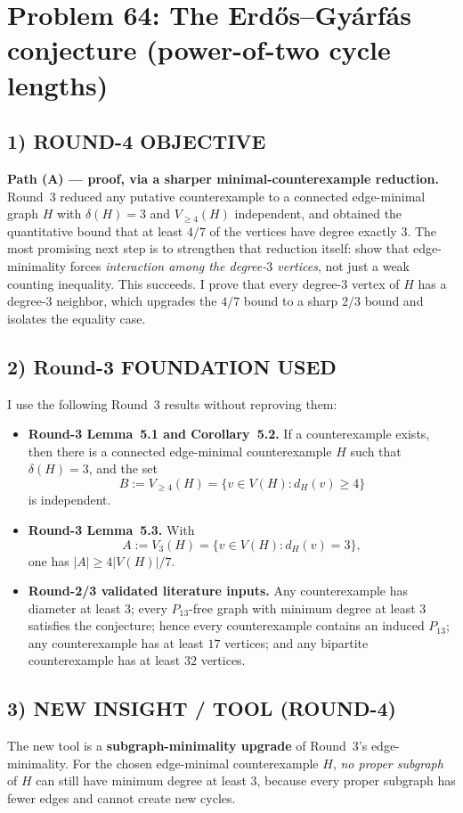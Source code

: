 
\section{Problem 64: The Erd\H{o}s--Gy\'arf\'as conjecture (power-of-two cycle lengths)}

\subsection*{1) ROUND-4 OBJECTIVE}
\textbf{Path (A) --- proof, via a sharper minimal-counterexample reduction.} Round~3 reduced any putative counterexample to a connected edge-minimal graph $H$ with $\delta(H)=3$ and $V_{\ge 4}(H)$ independent, and obtained the quantitative bound that at least $4/7$ of the vertices have degree exactly $3$. The most promising next step is to strengthen that reduction itself: show that edge-minimality forces \emph{interaction among the degree-$3$ vertices}, not just a weak counting inequality. This succeeds. I prove that every degree-$3$ vertex of $H$ has a degree-$3$ neighbor, which upgrades the $4/7$ bound to a sharp $2/3$ bound and isolates the equality case.

\subsection*{2) Round-3 FOUNDATION USED}
I use the following Round~3 results without reproving them:
\begin{itemize}
  \item \textbf{Round-3 Lemma~5.1 and Corollary~5.2.} If a counterexample exists, then there is a connected edge-minimal counterexample $H$ such that $\delta(H)=3$, and the set
  \[
    B:=V_{\ge 4}(H)=\{v\in V(H): d_H(v)\ge 4\}
  \]
  is independent.
  \item \textbf{Round-3 Lemma~5.3.} With
  \[
    A:=V_3(H)=\{v\in V(H): d_H(v)=3\},
  \]
  one has $|A|\ge 4|V(H)|/7$.
  \item \textbf{Round-2/3 validated literature inputs.} Any counterexample has diameter at least $3$; every $P_{13}$-free graph with minimum degree at least $3$ satisfies the conjecture; hence every counterexample contains an induced $P_{13}$; any counterexample has at least $17$ vertices; and any bipartite counterexample has at least $32$ vertices.
\end{itemize}

\subsection*{3) NEW INSIGHT / TOOL (ROUND-4)}
The new tool is a \textbf{subgraph-minimality upgrade} of Round~3's edge-minimality. For the chosen edge-minimal counterexample $H$, \emph{no proper subgraph} of $H$ can still have minimum degree at least $3$, because every proper subgraph has fewer edges and cannot create new cycles.

